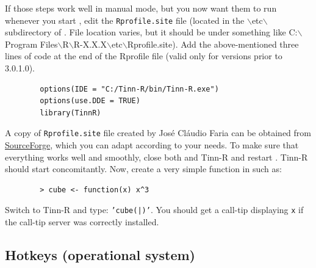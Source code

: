 \begin{itemize}
    If those steps work well in manual mode, but you now want them to run whenever
    you start \RR{}, edit the \texttt{Rprofile.site} file (located in the
    $\backslash$etc$\backslash$ subdirectory of \RR{}.  File location varies, but
    it should be under something like
    C:$\backslash$Program Files$\backslash$R$\backslash$R-X.X.X$\backslash$etc$\backslash$Rprofile.site).
    Add the above-mentioned three lines of code at the end of the Rprofile file (valid only for
    versions prior to 3.0.1.0).

    \begin{footnotesize}
      \begin{verbatim}
        options(IDE = "C:/Tinn-R/bin/Tinn-R.exe")
        options(use.DDE = TRUE)
        library(TinnR)
      \end{verbatim}
    \end{footnotesize}

    A copy of \texttt{Rprofile.site} file created by José Cláudio Faria can be obtained from
    \href{http://sourceforge.net/p/tinn-r/news/2013/01/rprofilesite-example/}{SourceForge},
    which you can adapt according to your needs. To make sure that everything works well and
    smoothly, close both \RR{} and Tinn-R and restart \RR{}. Tinn-R should start concomitantly.
    Now, create a very simple function in \RR{} such as:

    \begin{footnotesize}
      \begin{verbatim}
        > cube <- function(x) x^3
      \end{verbatim}
    \end{footnotesize}

    Switch to Tinn-R and type: \texttt{'cube(|)'}. You should get a call-tip displaying
    \texttt{x} if the \RR{} call-tip server was correctly installed.

\end{itemize}

\hypertarget{faq_hotkeys}{}
\subsection{Hotkeys (operational system)}

